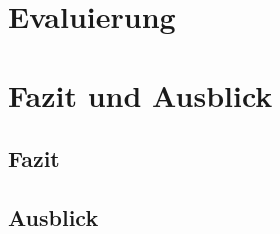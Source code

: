 \documentclass[10pt]{book}
\begin{document}
\chapter{Evaluierung}\label{chp:Evaluation}
  \blindtext


\chapter{Fazit und Ausblick}\label{chp:Conclusions}
  \section{Fazit}
    \blindtext
  \section{Ausblick}
    \blindtext


\backmatter
  \tocbibliography
\end{document}
